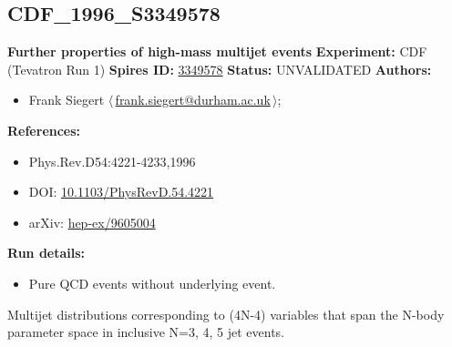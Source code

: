 \subsection[CDF\_1996\_S3349578]{CDF\_1996\_S3349578\,\cite{Abe:1996nn}}
\textbf{Further properties of high-mass multijet events}\newline
\textbf{Experiment:} CDF (Tevatron Run 1) \newline
\textbf{Spires ID:} \href{http://www.slac.stanford.edu/spires/find/hep/www?rawcmd=key+3349578}{3349578}\newline
\textbf{Status:} UNVALIDATED\newline
\textbf{Authors:}
\begin{itemize}
  \item Frank Siegert $\langle\,$\href{mailto:frank.siegert@durham.ac.uk}{frank.siegert@durham.ac.uk}$\,\rangle$;
\end{itemize}
\textbf{References:}
\begin{itemize}
  \item Phys.Rev.D54:4221-4233,1996
  \item DOI: \href{http://dx.doi.org/10.1103/PhysRevD.54.4221}{10.1103/PhysRevD.54.4221}
  \item arXiv: \href{http://arxiv.org/abs/hep-ex/9605004}{hep-ex/9605004}
\end{itemize}
\textbf{Run details:}
\begin{itemize}

  \item Pure QCD events without underlying event.\end{itemize}

\noindent Multijet distributions corresponding to (4N-4) variables that span the N-body parameter space in inclusive N=3, 4, 5 jet events.

\clearpage


\clearpage

